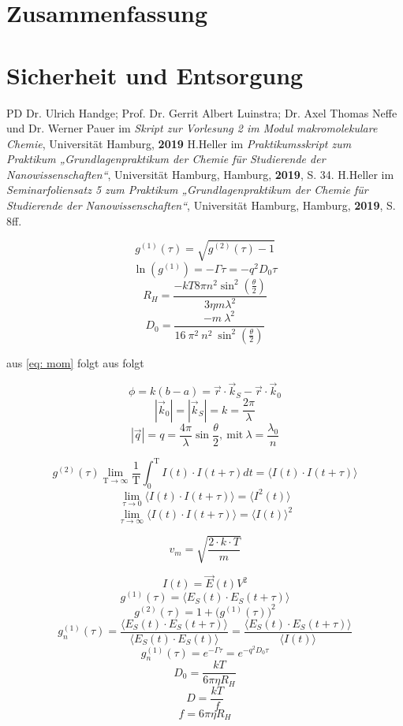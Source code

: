\documentclass[
	a4paper,										%
	12pt,											%
	twoside,										%
	headsepline,								%
	footsepline,									%
	captions=tableheading,					%
]{scrartcl}
\newcommand{\formel}[2]{				%
	\begin{equation}
		\label{eq: #1}							%
		#2											%
	\end{equation}}
\begin{document}
\section{Zusammenfassung}

\section{Sicherheit und Entsorgung}

\begin{thebibliography}{}
	PD Dr. Ulrich Handge; Prof. Dr. Gerrit Albert Luinstra; Dr. Axel Thomas Neffe und Dr. Werner Pauer im \textit{Skript zur Vorlesung 2 im Modul makromolekulare Chemie}, Universität Hamburg, \textbf{2019}
	H.Heller im \textit{Praktikumsskript zum Praktikum „Grundlagenpraktikum der Chemie für
	Studierende der Nanowissenschaften“}, Universität Hamburg, Hamburg, \textbf{2019}, S. 34.
	H.Heller im \textit{Seminarfoliensatz 5 zum Praktikum „Grundlagenpraktikum der Chemie für
	Studierende der Nanowissenschaften“}, Universität Hamburg, Hamburg, \textbf{2019}, S. 8ff.
	
\end{thebibliography}

\formel{mom}{g^{(1)}(\tau) = \sqrt{g^{(2)}(\tau) - 1}}
\formel{}{\ln(g^{(1)}) = -\Gamma \tau = -q^2 D_0 \tau}
\formel{}{R_H = \frac{-k T 8 \pi n^2 \sin^2({\frac{\theta}{2}})}{3 \eta m \lambda^2}}
\formel{}{D_0 = \frac{- m \ \lambda^2}{16 \ \pi^2 \ n^2 \ \sin^2(\frac{\theta}{2})}}

aus \ref{eq: mom} folgt
aus  folgt

\formel{}{\phi = k(b-a) = \vec{r} \cdot \vec{k}_S - \vec{r} \cdot \vec{k}_0}
\formel{}{|\vec{k}_0| = |\vec{k}_S| = k = \frac{2\pi}{\lambda}}
\formel{}{|\vec{q}| = q = \frac{4\pi}{\lambda}\sin{\frac{\theta}{2}},  \ \text{mit} \ \lambda = \frac{\lambda_0}{n}}


\formel{}{g^{(2)}(\tau) \lim \limits_{\text{T} \to \infty} \frac{1}{\text{T}} \int_{0}^{\text{T}} I(t) \cdot I(t+\tau) dt = \langle I(t) \cdot I(t+\tau) \rangle}
\formel{}{\lim \limits_{\tau \to 0} \langle I(t) \cdot I(t+\tau) \rangle = \langle I^2(t) \rangle}
\formel{}{\lim \limits_{\tau \to \infty} \langle I(t) \cdot I(t+\tau) \rangle = \langle I(t) \rangle^2}

\formel{}{v_m = \sqrt{\frac{2 \cdot k \cdot T}{m}}}

\formel{}{I(t) = \vec{E}(t) V^2}
\formel{}{g^{(1)}(\tau) = \langle E_S(t) \cdot E_S(t+ \tau) \rangle}
\formel{}{g^{(2)}(\tau) = 1 + \bigg(g^{(1)}(\tau) \bigg)^2}
\formel{}{g_n^{(1)}(\tau) = \frac{ \langle E_S(t) \cdot E_S(t+ \tau) \rangle}{\langle E_S(t) \cdot E_S(t) \rangle} = \frac{ \langle E_S(t) \cdot E_S(t+ \tau) \rangle}{\langle I(t) \rangle} }
\formel{}{g_n^{(1)}(\tau) = e^{-\Gamma \tau} = e^{-q^2D_0 \tau}}
\formel{}{D_0= \frac{kT}{6 \pi \eta R_H}}
\formel{}{D = \frac{kT}{f}}
\formel{}{f = 6 \pi \eta R_H}
\end{document}

